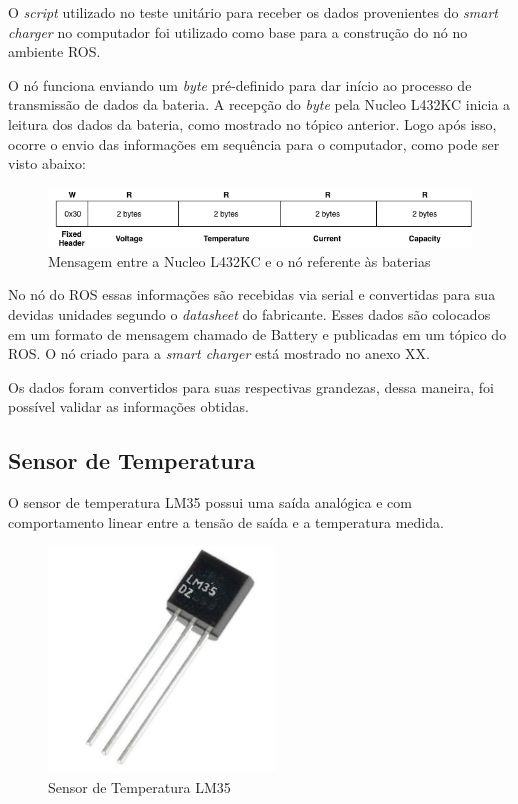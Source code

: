 		  O \textit{script} utilizado no teste unitário para receber os dados provenientes do \textit{smart charger} no computador foi utilizado como base para a construção do nó no ambiente ROS.
     
     O nó funciona enviando um \textit{byte} pré-definido para dar início ao processo de transmissão de dados da bateria. A recepção do \textit{byte} pela Nucleo L432KC inicia a leitura dos dados da bateria, como mostrado no tópico anterior. Logo após isso, ocorre o envio das informações em sequência para o computador, como pode ser visto abaixo:
      
      \begin{figure}[!ht]
		   \centering
		   \includegraphics[width=16cm]{Figures/batt_protocol_2.png}
		   \caption{Mensagem entre a Nucleo L432KC e o nó referente às baterias}
		   \label{fig:battprotocol2}
		\end{figure}
		      
      No nó do ROS essas informações são recebidas via serial e convertidas para sua devidas unidades segundo o \textit{datasheet} do fabricante. Esses dados são colocados em um formato de mensagem chamado de Battery e publicadas em um tópico do ROS. O nó criado para a \textit{smart charger} está mostrado no anexo XX.
	    
	    Os dados foram convertidos para suas respectivas grandezas, dessa maneira, foi possível validar as informações obtidas.
    
    \subsection{Sensor de Temperatura}
    
	    O sensor de temperatura LM35 possui uma saída analógica e com comportamento linear entre a tensão de saída e a temperatura medida.
	    
	    \begin{figure}[!ht]
			   \centering
			   \includegraphics[width=6cm]{Figures/lm35.jpg}
			   \caption{Sensor de Temperatura LM35}
			   \label{fig:LM35}
		\end{figure}
	   
